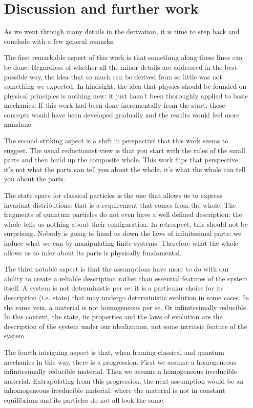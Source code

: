 \documentclass[smallextended]{svjour3}
\numberwithin{equation}{section}
\begin{document}
\section{Discussion and further work}
\label{sec:discussion}

As we went through many details in the derivation, it is time to step back and conclude with a few general remarks.

The first remarkable aspect of this work is that something along these lines can be done. Regardless of whether all the minor details are addressed in the best possible way, the idea that so much can be derived from so little was not something we expected. In hindsight, the idea that physics should be founded on physical principles is nothing new: it just hasn't been thoroughly applied to basic mechanics. If this work had been done incrementally from the start, these concepts would have been developed gradually and the results would feel more mundane.

The second striking aspect is a shift in perspective that this work seems to suggest. The usual reductionist view is that you start with the rules of the small parts and then build up the composite whole. This work flips that perspective: it's not what the parts can tell you about the whole, it's what the whole can tell you about the parts.

The state space for classical particles is the one that allows us to express invariant distributions: that is a requirement that comes from the whole. The fragments of quantum particles do not even have a well defined description: the whole tells us nothing about their configuration. In retrospect, this should not be surprising. Nobody is going to hand us down the laws of infinitesimal parts: we induce  what we can by manipulating finite systems. Therefore what the whole allows us to infer about its parts is physically fundamental.

The third notable aspect is that the assumptions have more to do with our ability to create a reliable description rather than essential features of the system itself. A system is not deterministic per se: it is a particular choice for its description (i.e. state) that may undergo deterministic evolution in some cases. In the same vein, a material is not homogeneous per se. Or infinitesimally reducible. In this context, the state, its properties and the laws of evolution are the description of the system under our idealization, not some intrinsic feature of the system.

The fourth intriguing aspect is that, when framing classical and quantum mechanics in this way, there is a progression. First we assume a homogeneous infinitesimally reducible material. Then we assume a homogeneous irreducible material. Extrapolating from this progression, the next assumption would be an inhomogeneous irreducible material: where the material is not in constant equilibrium and its particles do not all look the same.
\end{document}
